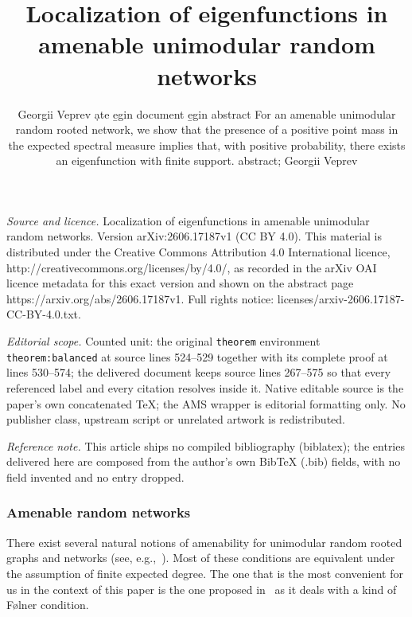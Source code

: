\documentclass[10pt,a4paper]{amsart}
\begin{document}
\title[Localization of eigenfunctions in amenable unimodular random]{Localization of eigenfunctions in amenable unimodular random networks}
\author{Georgii Veprev ạte e̱gin document e̱gin abstract For an amenable unimodular random rooted network, we show that the presence of a positive point mass in the expected spectral measure implies that, with positive probability, there exists an eigenfunction with finite support. abstract; Georgii Veprev}
\date{}
\maketitle
\noindent\emph{Source and licence.} Localization of eigenfunctions in amenable unimodular random networks. Version arXiv:2606.17187v1 (CC BY 4.0). This material is distributed under the Creative Commons Attribution 4.0 International licence, http://creativecommons.org/licenses/by/4.0/, as recorded in the arXiv OAI licence metadata for this exact version and shown on the abstract page https://arxiv.org/abs/2606.17187v1. Full rights notice: licenses/arxiv-2606.17187-CC-BY-4.0.txt.\par\smallskip
\noindent\textit{Editorial scope.} Counted unit: the original \texttt{theorem} environment \texttt{theorem:balanced} at source lines 524--529 together with its complete proof at lines 530--574; the delivered document keeps source lines 267--575 so that every referenced label and every citation resolves inside it. Native editable source is the paper's own concatenated TeX; the AMS wrapper is editorial formatting only. No publisher class, upstream script or unrelated artwork is redistributed.
\par\smallskip\noindent\textit{Reference note.} This article ships no compiled bibliography (biblatex); the entries delivered here are composed from the author's own BibTeX (.bib) fields, with no field invented and no entry dropped.
\subsubsection{Amenable random networks}\label{subsection_amen}

There exist several natural notions of amenability for unimodular random rooted graphs and networks (see, e.g.,~\cite{AL07, Ka1997amenability}). Most of these conditions are equivalent under the assumption of finite expected degree. The one that is the most convenient for us in the context of this paper is the one proposed in~\cite{AL07} as it deals with a kind of F\o lner condition. 
\end{document}
